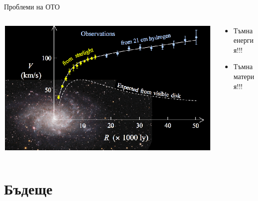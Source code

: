 \documentclass[10pt,a4paper]{beamer}
\begin{document}
        \begin{frame}{ Проблеми на ОТО }
            \begin{columns}
                \begin{column}{0.5\textwidth}
                    \includegraphics[width=\textwidth]{images/big_bang_dark_matter.png}
                \end{column}
                \begin{column}{0.5\textwidth}
                    \begin{itemize}
                        \item Тъмна енергия!!!
                        \item Тъмна материя!!!
                    \end{itemize}
                \end{column}
            \end{columns}
        \end{frame}
        
    \section{ Бъдеще }
        
\end{document}
